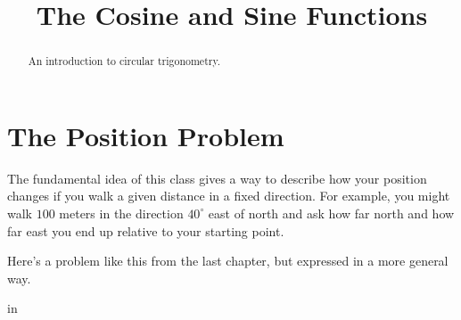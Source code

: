\documentclass{ximera}
\title{The Cosine and Sine Functions}
\newcommand{\pskip}{\vskip 0.1 in}
\begin{document}
\begin{abstract}
An introduction to circular trigonometry.
\end{abstract}
\maketitle

\section{The Position Problem}

The fundamental idea of this class gives a way to describe how your position changes if you walk a given distance in a fixed direction. For example, you might walk $100$ meters in the direction $40^\circ$ east of north and ask how far north and how far east you end up relative to your starting point.

Here's a problem like this from the last chapter, but expressed in a more general way.

\pskip
\end{document}
